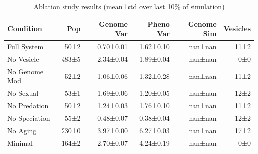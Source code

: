 \begin{table}[h]
\centering
\caption{Ablation study results (mean±std over last 10\% of simulation)}
\label{tab:ablation}
\begin{tabular}{lrrrrr}
\toprule
Condition & Pop & Genome Var & Pheno Var & Genome Sim & Vesicles \\
\midrule
Full System & 50±2 & 0.70±0.01 & 1.62±0.10 & nan±nan & 11±2 \\
No Vesicle & 483±5 & 2.34±0.04 & 1.89±0.04 & nan±nan & 0±0 \\
No Genome Mod & 52±2 & 1.06±0.06 & 1.32±0.28 & nan±nan & 11±2 \\
No Sexual & 53±1 & 1.69±0.06 & 1.20±0.05 & nan±nan & 12±2 \\
No Predation & 50±2 & 1.24±0.03 & 1.76±0.10 & nan±nan & 11±2 \\
No Speciation & 55±2 & 0.48±0.07 & 0.38±0.04 & nan±nan & 12±2 \\
No Aging & 230±0 & 3.97±0.00 & 6.27±0.03 & nan±nan & 17±2 \\
Minimal & 164±2 & 2.70±0.07 & 4.24±0.19 & nan±nan & 0±0 \\
\bottomrule
\end{tabular}
\end{table}

